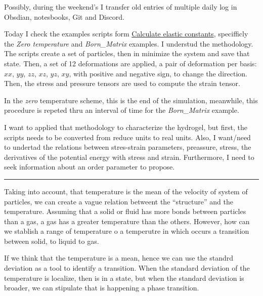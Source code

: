 \documentclass[a4paper, 11pt, oneside]{researchjournal} %
\begin{document}
Possibly, during the weekend's I transfer old entries of multiple daily log in Obsdian, notesbooks, Git and Discord.




Today I check the examples scripts form \href{https://docs.lammps.org/Howto_elastic.html}{Calculate elastic constants}, specifficly the \textit{Zero temperature} and \textit{Born\_Matrix} examples.
I understud the methodology.
The scripts create a set of particles, then in minimize the system and save that state.
Then, a set of 12 deformations are applied, a pair of deformation per basis: $xx$, $yy$, $zz$, $xz$, $yz$, $xy$, with positive and negative sign, to change the direction. 
Then, the stress and pressure tensors are used to compute the strain tensor.

In the \textit{zero} temperature scheme, this is the end of the simulation, meanwhile, this procedure is repeted thru an interval of time for the \textit{Born\_Matrix} example.

I want to applied that methodology to characterize the hydrogel, but first, the scripts needs to be converted from reduce units to real units.
Also, I want/need to undertad the relations between stres-strain parameters, preassure, stress, the derivatives of the potential energy with stress and strain.
Furthermore, I need to seek information about an order parameter to propose.

\rule{\textwidth}{0.4pt}

Taking into account, that temperature is the mean of the velocity of system of particles, we can create a vague relation betweent the ``structure'' and the temperature.
Assuming that a solid or fluid has more bonds between particles than a gas, a gas has a greater temperature than the others.
However, how can we stablish a range of temperature o a temperutre in which occurs a transition between solid, to liquid to gas.

If we think that the temperature is a mean, hence we can use the standrd deviation as a tool to identify a transition.
When the standard deviation of the temperature is localize, then is in a state, but when the standard deviation is broader, we can stipulate that is happening a phase transition.
\end{document}
